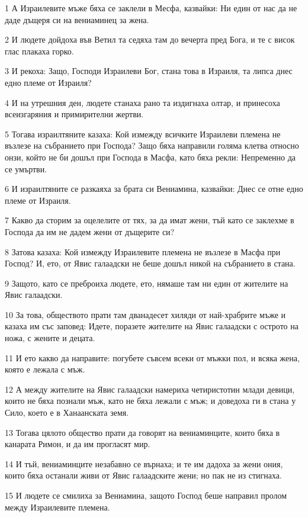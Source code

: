 \par 1 А Израилевите мъже бяха се заклели в Месфа, казвайки: Ни един от нас да не даде дъщеря си на вениаминец за жена.
\par 2 И людете дойдоха във Ветил та седяха там до вечерта пред Бога, и те с висок глас плакаха горко.
\par 3 И рекоха: Защо, Господи Израилеви Бог, стана това в Израиля, та липса днес едно племе от Израиля?
\par 4 И на утрешния ден, людете станаха рано та издигнаха олтар, и принесоха всеизгаряния и примирителни жертви.
\par 5 Тогава израилтяните казаха: Кой измежду всичките Израилеви племена не възлезе на събранието при Господа? Защо бяха направили голяма клетва относно онзи, който не би дошъл при Господа в Масфа, като бяха рекли: Непременно да се умъртви.
\par 6 И израилтяните се разкаяха за брата си Вениамина, казвайки: Днес се отне едно племе от Израиля.
\par 7 Какво да сторим за оцелелите от тях, за да имат жени, тъй като се заклехме в Господа да им не дадем жени от дъщерите си?
\par 8 Затова казаха: Кой измежду Израилевите племена не възлезе в Масфа при Господ? И, ето, от Явис галаадски не беше дошъл никой на събранието в стана.
\par 9 Защото, като се преброиха людете, ето, нямаше там ни един от жителите на Явис галаадски.
\par 10 За това, обществото прати там дванадесет хиляди от най-храбрите мъже и казаха им със заповед: Идете, поразете жителите на Явис галаадски с острото на ножа, с жените и децата.
\par 11 И ето какво да направите: погубете съвсем всеки от мъжки пол, и всяка жена, която е лежала с мъж.
\par 12 А между жителите на Явис галаадски намериха четиристотин млади девици, които не бяха познали мъж, като не бяха лежали с мъж; и доведоха ги в стана у Сило, което е в Ханаанската земя.
\par 13 Тогава цялото общество прати да говорят на вениаминците, които бяха в канарата Римон, и да им прогласят мир.
\par 14 И тъй, вениаминците незабавно се върнаха; и те им дадоха за жени ония, които бяха останали живи от Явис галаадските жени; но пак не из стигнаха.
\par 15 И людете се смилиха за Вениамина, защото Господ беше направил пролом между Израилевите племена.
